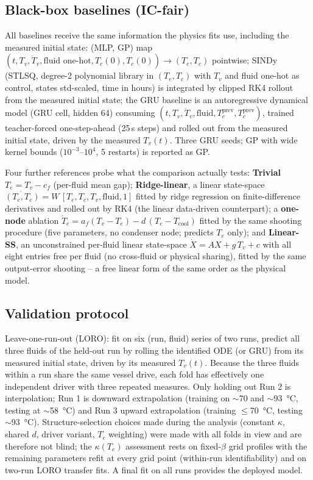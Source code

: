 \subsection{Black-box baselines (IC-fair)}
All baselines receive the same information the physics fits use, including the measured initial state:
(MLP, GP) map $(t, T_v, \dot T_v, \text{fluid one-hot}, T_e(0), T_c(0)) \to (T_e, T_c)$ pointwise;
SINDy (STLSQ, degree-2 polynomial library in $(T_e,T_c)$ with $T_v$ and fluid one-hot as control, states std-scaled,
time in hours) is integrated by clipped RK4 rollout from the measured initial state; the GRU baseline is an
autoregressive dynamical model (GRU cell, hidden 64) consuming $(t, T_v, \dot T_v, \text{fluid}, T_e^{\mathrm{prev}},
T_c^{\mathrm{prev}})$, trained teacher-forced one-step-ahead (25\,s steps) and rolled out from the measured initial
state, driven by the measured $T_v(t)$. Three GRU seeds; GP with wide kernel bounds ($10^{-3}$--$10^{4}$,
5 restarts) is reported as GP.

Four further references probe what the comparison actually tests:
\textbf{Trivial} $T_e = T_v - c_f$ (per-fluid mean gap); \textbf{Ridge-linear}, a linear state-space
$\dot{(T_e,T_c)} = W\,[T_e, T_c, T_v, \text{fluid}, 1]$ fitted by ridge regression on finite-difference
derivatives and rolled out by RK4 (the linear data-driven counterpart); a \textbf{one-node} ablation
$\dot T_e = a_f(T_v - T_e) - d\,(T_e - T_{\mathrm{cool}})$ fitted by the same shooting procedure (five parameters,
no condenser node; predicts $T_e$ only); and \textbf{Linear-SS}, an unconstrained per-fluid linear state-space
$\dot X = A X + g\,T_v + c$ with all eight entries free per fluid (no cross-fluid or physical sharing),
fitted by the same output-error shooting -- a free linear form of the same order as the physical model.

\subsection{Validation protocol}
Leave-one-run-out (LORO): fit on six (run, fluid) series of two runs, predict all three fluids of the held-out run by
rolling the identified ODE (or GRU) from its measured initial state, driven by its measured $T_v(t)$. Because the
three fluids within a run share the same vessel drive, each fold has effectively one independent driver with three
repeated measures. Only holding out Run 2 is interpolation; Run 1 is downward extrapolation (training on
$\sim$70 and $\sim$\SI{93}{\celsius}, testing at $\sim$\SI{58}{\celsius}) and Run 3 upward extrapolation
(training $\le$\SI{70}{\celsius}, testing $\sim$\SI{93}{\celsius}). Structure-selection choices made during the
analysis (constant $\kappa$, shared $d$, driver variant, $T_c$ weighting) were made with all folds in view and are
therefore not blind; the $\kappa(T_e)$ assessment rests on fixed-$\beta$ grid profiles with the remaining
parameters refit at every grid point (within-run identifiability) and on two-run LORO transfer fits.
A final fit on all runs provides the deployed model.
